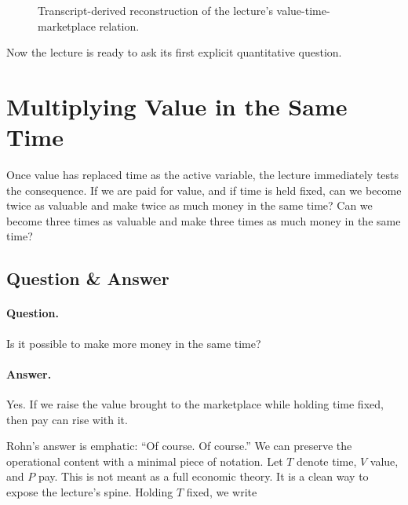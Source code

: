 \begin{figure}[h]
\centering
{}
\caption{Transcript-derived reconstruction of the lecture's value-time-marketplace relation.}
\end{figure}

Now the lecture is ready to ask its first explicit quantitative question.

\section{Multiplying Value in the Same Time}

Once value has replaced time as the active variable, the lecture immediately tests the consequence. If we are paid for value, and if time is held fixed, can we become twice as valuable and make twice as much money in the same time? Can we become three times as valuable and make three times as much money in the same time?

\subsection{Question \& Answer}

\paragraph{Question.} Is it possible to make more money in the same time?

\paragraph{Answer.} Yes. If we raise the value brought to the marketplace while holding time fixed, then pay can rise with it.

Rohn's answer is emphatic: ``Of course. Of course.'' We can preserve the operational content with a minimal piece of notation. Let \(T\) denote time, \(V\) value, and \(P\) pay. This is not meant as a full economic theory. It is a clean way to expose the lecture's spine. Holding \(T\) fixed, we write

